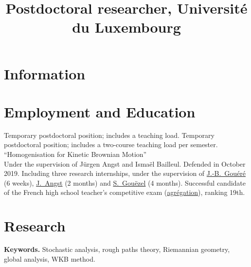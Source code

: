 \documentclass[11pt,classic,colorlinks]{moderncv}
\title{Postdoctoral researcher, Université du Luxembourg}
\begin{document}
\makecvtitle
{}

\vspace{-25pt}

\section{Information}

\section{Employment and Education}

        {Temporary postdoctoral position; includes a teaching load.}
        {Temporary postdoctoral position; includes a two-course teaching load per semester.}
        {``Homogenisation for Kinetic Brownian Motion''\\Under the supervision of Jürgen Angst and Ismaël Bailleul. Defended in October 2019.}
   {Including three research internships, under the supervision of \href{http://www.lmpt.univ-tours.fr/~gouere/}{J.-B.~Gouéré} (6 weeks), \href{https://perso.univ-rennes1.fr/jurgen.angst/}{J.~Angst} (2 months) and \href{http://www.math.sciences.univ-nantes.fr/~gouezel/}{S.~Gouëzel} (4 months). \newline
    Successful candidate of the French high school teacher's competitive exam (\href{https://en.wikipedia.org/wiki/Agr\%C3\%A9gation}{agrégation}), ranking 19th.}

\section{Research}

\textbf{Keywords.} Stochastic analysis, rough paths theory, Riemannian geometry, global analysis, WKB method.
\end{document}
